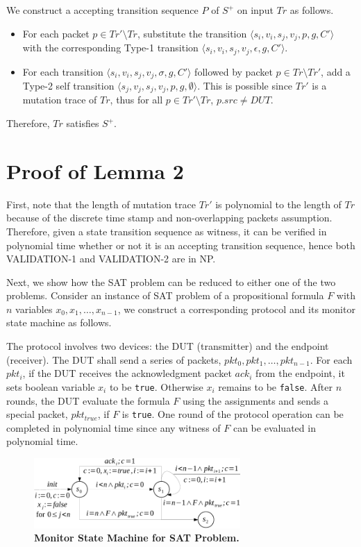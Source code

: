 We construct a accepting transition sequence $P$ of $S^+$ on input $Tr$ as
follows.
\begin{itemize}
  \item For each packet $p \in Tr' \setminus Tr$, substitute the transition
    $\langle s_i, v_i, s_j, v_j, p, g, C'\rangle$ with the corresponding Type-1
    transition $\langle s_i, v_i, s_j, v_j, \epsilon, g, C'\rangle$.
  \item For each transition $\langle s_i, v_i, s_j, v_j, \sigma, g, C'\rangle$
    followed by packet $p \in Tr\setminus Tr'$, add a Type-2 self
    transition $\langle s_j, v_j, s_j, v_j, p, g, \emptyset\rangle$. This is
    possible since $Tr'$ is a mutation trace of $Tr$, thus  for all $p \in Tr'
    \setminus Tr$, $p.src \ne DUT$.
\end{itemize}
Therefore, $Tr$ satisfies $S^+$.

\section{Proof of Lemma 2}
\label{app:lemma2}

First, note that the length of mutation trace $Tr'$ is polynomial to the
length of $Tr$ because of the discrete time stamp and non-overlapping packets
assumption.
Therefore, given a state transition sequence as witness, it can be verified in
polynomial time whether or not it is an accepting transition sequence, hence
both VALIDATION-1 and VALIDATION-2 are in NP.

Next, we show how the SAT problem can be reduced to either one of the two
problems.
Consider an instance of SAT problem of a propositional formula $F$ with $n$
variables $x_0,x_1,\ldots, x_{n-1}$, we construct a corresponding protocol and
its monitor state machine as follows.

The protocol involves two devices: the DUT (transmitter) and the endpoint
(receiver).
The DUT shall send a series of packets, $pkt_0, pkt_1,\ldots, pkt_{n-1}$.
For each $pkt_i$, if the DUT receives the
acknowledgment packet $ack_i$ from the endpoint, it sets boolean variable
$x_i$ to be \texttt{true}.
Otherwise $x_i$ remains to be \texttt{false}.
After $n$ rounds, the DUT evaluate the formula $F$ using the assignments and
sends a special packet, $pkt_{true}$, if $F$ is \texttt{true}.
One round of the protocol operation can be completed in polynomial time since
any witness of $F$ can be evaluated in polynomial time.

\begin{figure}[h!]
  \centering
  \includegraphics[width=0.7\textwidth]{./figures/sat_sm.pdf}
  \caption{\textbf{Monitor State Machine for SAT Problem.}}
  \label{fig:sat}
\end{figure}



